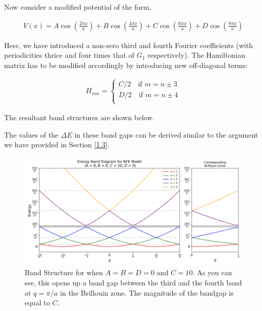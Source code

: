 \documentclass[12pt,a4paper]{article}
\begin{document}
Now consider a modified potential of the form,

\begin{align*}
    V(x) = A\cos\left(\frac{2\pi x}{a}\right) + B\cos\left(\frac{4\pi x}{a}\right) + C\cos\left(\frac{6\pi x}{a}\right) + D\cos\left(\frac{8\pi x}{a}\right)
\end{align*}

Here, we have introduced a non-zero third and fourth Fourier coefficients (with periodicities thrice and four times that of $G_1$ respectively). The Hamiltonian matrix has to be modified accordingly by introducing new off-diagonal terms:

\begin{align*}
    H_{mn} = \begin{cases}
        C/2 \,\,\,\, \text{ if } m=n\pm 3\\
        D/2 \,\,\,\, \text{ if } m=n\pm 4\\
     \end{cases}
\end{align*}

The resultant band structures are shown below.

The values of the $\Delta E$ in these band gaps can be derived similar to the argument we have provided in Section \ref{1.3}.

\begin{figure}[H]
    \centering
    \includegraphics[width=1\linewidth]{images/g3.png}
    \caption{Band Structure for when $A=B=D=0$ and $C=10$. As you can see, this opens up a band gap between the third and the fourth band at $q=\pi/a$ in the Brillouin zone. The magnitude of the bandgap is equal to $C$.}
    \label{g3}
\end{figure}
\end{document}
